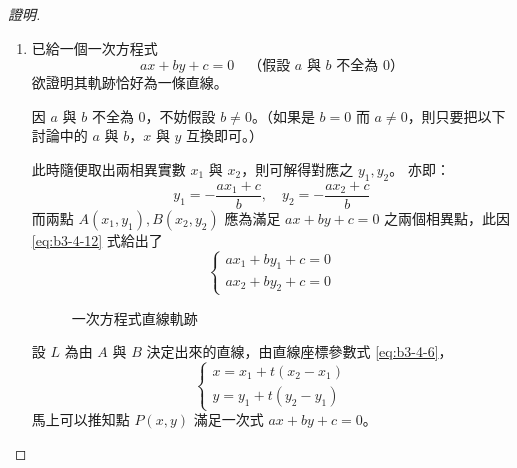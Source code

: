 \begin{proof}[證明]
\begin{enumerate}[label=(\Roman*), leftmargin=2em]
  \item 已給一個一次方程式
  \[ ax + by + c = 0 \quad\text{（假設 $a$ 與 $b$ 不全為 0）} \]
  欲證明其軌跡恰好為一條直線。
  
  因 $a$ 與 $b$ 不全為 0，不妨假設 $b \neq 0$。（如果是 $b = 0$ 而 $a \neq 0$，則只要把以下討論中的 $a$ 與 $b$，$x$ 與 $y$ 互換即可。）
  
  此時隨便取出兩相異實數 $x_1$ 與 $x_2$，則可解得對應之 $y_1, y_2$。
  亦即：
  \begin{equation}
  y_1 = -\frac{a x_1 + c}{b}, \quad y_2 = -\frac{a x_2 + c}{b}
  \label{eq:b3-4-12}
  \end{equation}
  而兩點 $A(x_1, y_1), B(x_2, y_2)$ 應為滿足 $ax + by + c = 0$ 之兩個相異點，此因 \eqref{eq:b3-4-12} 式給出了
  \begin{equation}
  \begin{cases}
  a x_1 + b y_1 + c = 0 \\
  a x_2 + b y_2 + c = 0
  \end{cases}
  \label{eq:b3-4-13}
  \end{equation}
  
  \begin{figure}[H]
  \centering
  \caption{一次方程式直線軌跡}
  \label{fig:4-22}
  \end{figure}
  
  設 $L$ 為由 $A$ 與 $B$ 決定出來的直線，由直線座標參數式 \eqref{eq:b3-4-6}，
  \[ \begin{cases} x = x_1 + t(x_2 - x_1) \\ y = y_1 + t(y_2 - y_1) \end{cases} \]
  馬上可以推知點 $P(x, y)$ 滿足一次式 $ax + by + c = 0$。
  

\end{enumerate}
\end{proof}

